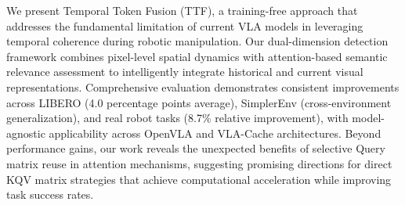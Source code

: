\documentclass[letterpaper]{article}
\begin{document}
We present Temporal Token Fusion (TTF), a training-free approach that addresses the fundamental limitation of current VLA models in leveraging temporal coherence during robotic manipulation. Our dual-dimension detection framework combines pixel-level spatial dynamics with attention-based semantic relevance assessment to intelligently integrate historical and current visual representations. Comprehensive evaluation demonstrates consistent improvements across LIBERO (4.0 percentage points average), SimplerEnv (cross-environment generalization), and real robot tasks (8.7\% relative improvement), with model-agnostic applicability across OpenVLA and VLA-Cache architectures. Beyond performance gains, our work reveals the unexpected benefits of selective Query matrix reuse in attention mechanisms, suggesting promising directions for direct KQV matrix strategies that achieve computational acceleration while improving task success rates. 





% 
\end{document}
